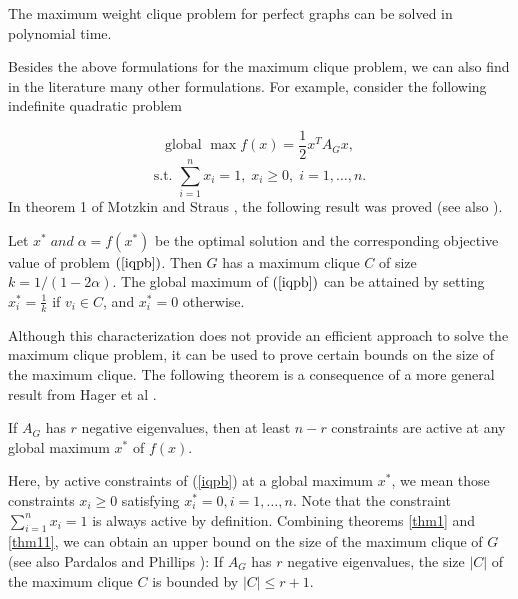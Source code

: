 \begin{thm}
The maximum weight clique problem for perfect graphs can be solved
in polynomial time.
	\label{thm04}
\end{thm}

Besides the above formulations for the maximum clique problem, we
can also find in the literature many other formulations. For
example, consider the following indefinite \cite{PaRo87} quadratic
problem

\begin{equation}
\mbox{global } \max f(x) = \frac{1}{2} x^{T} A_{G} x, 
	\label{iqpb}
\end{equation}
\[ \mbox{s.t. } \sum_{i=1}^{n} x_{i} = 1, \; x_{i} \geq 0, \;
	i = 1,\ldots,n. \]
In theorem 1 of Motzkin and Straus \cite{MoSt65}, the following
result was proved (see also \cite{AhErLi88}). 



\begin{thm}
Let $x^{*} \; and \; \alpha = f(x^{*})$ be the optimal solution and
the corresponding objective value of problem $(\ref{iqpb})$.
Then $G$ has a maximum clique $C$ of size $k = 1/(1 - 2 \alpha)$.
The global maximum of $(\ref{iqpb})$ can be attained by setting
$x^{*}_{i} = \frac{1}{k}$ if $v_{i} \in C$, and $x^{*}_{i} = 0$
otherwise.
	\label{thm1}
\end{thm}

Although this characterization does not provide an efficient
approach to solve the maximum clique problem, it can be used to
prove certain bounds on the size of the maximum clique. The
following theorem is a consequence of a more general result from
Hager et al \cite{HaPaRoSa87}.

\begin{thm}
If $A_{G}$ has $r$ negative eigenvalues, then at least $n-r$
constraints are active at any global maximum $x^{*}$ of $f(x)$.
	\label{thm11} 


\end{thm}

Here, by active constraints of (\ref{iqpb}) at a global maximum
$x^{*}$, we mean those constraints $x_i \geq 0$ satisfying
$x^{*}_i = 0, i = 1, \ldots, n$. Note that the constraint
$\sum_{i=1}^{n} x_{i} = 1$ is always active by definition. Combining
theorems \ref{thm1} and \ref{thm11}, we can obtain an upper bound on
the size of the maximum clique of $G$ (see also Pardalos and
Phillips \cite{PaPh90}): If $A_{G}$ has $r$ negative eigenvalues,
the size $|C|$ of the maximum clique $C$ is bounded by
$|C| \leq r + 1$. 


